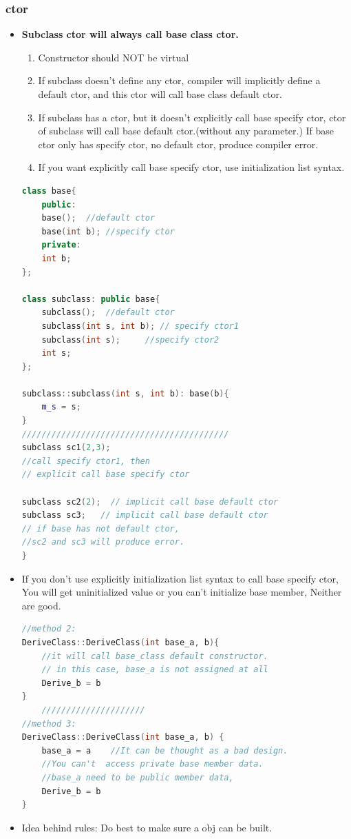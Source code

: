\documentclass[a4paper,11pt,twoside]{book}
\begin{document}
\subsubsection{ctor}
\begin{itemize}
	
	\item  \textbf{Subclass ctor will always call base class ctor.}
	
	\begin{enumerate}
		\item Constructor should NOT be virtual
		
		\item If subclass doesn't define any ctor, compiler will implicitly define a default ctor, and this ctor will call base class default ctor.
		
		\item If subclass has a ctor, but it doesn't explicitly call base specify ctor, ctor of subclass will call base default ctor.(without any parameter.) If base ctor only has specify ctor, no default ctor, produce compiler error.
		
		\item If you want explicitly call base specify ctor, use initialization list syntax.
	\end{enumerate}
	
\begin{lstlisting}[frame=single, language=c++]
class base{
	public:
	base();  //default ctor
	base(int b); //specify ctor
	private:
	int b;
};
	
class subclass: public base{
	subclass();  //default ctor
	subclass(int s, int b); // specify ctor1
	subclass(int s);     //specify ctor2
	int s;
};
	
subclass::subclass(int s, int b): base(b){
	m_s = s;
}
//////////////////////////////////////////
subclass sc1(2,3);
//call specify ctor1, then
// explicit call base specify ctor
	
subclass sc2(2);  // implicit call base default ctor
subclass sc3;   // implicit call base default ctor
// if base has not default ctor,
//sc2 and sc3 will produce error.
}
\end{lstlisting}
	\item If you don't use  explicitly initialization list syntax to call base specify ctor, You will get uninitialized value or you can't initialize base member, Neither are good.
\begin{lstlisting}[frame=single, language=c++]
//method 2:
DeriveClass::DeriveClass(int base_a, b){
	//it will call base_class default constructor.
	// in this case, base_a is not assigned at all
	Derive_b = b
}	
	/////////////////////
//method 3:
DeriveClass::DeriveClass(int base_a, b) {
	base_a = a    //It can be thought as a bad design.
	//You can't  access private base member data.
	//base_a need to be public member data,
	Derive_b = b
}
\end{lstlisting}
	\item Idea behind rules: Do best to make sure a obj can be built.	
\end{itemize}
\end{document}
